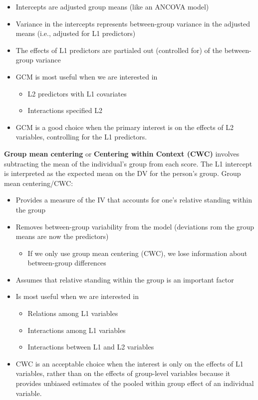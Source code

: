 \documentclass[
  english,
]{book}
\providecommand{\tightlist}{%
  \setlength{\itemsep}{0pt}\setlength{\parskip}{0pt}}
\begin{document}
\begin{itemize}
\tightlist
\item
  Intercepts are adjusted group means (like an ANCOVA model)
\item
  Variance in the intercepts represents between-group variance in the adjusted means (i.e., adjusted for L1 predictors)
\item
  The effects of L1 predictors are partialed out (controlled for) of the between-group variance
\item
  GCM is most useful when we are interested in

  \begin{itemize}
  \tightlist
  \item
    L2 predictors with L1 covariates
  \item
    Interactions specified L2
  \end{itemize}
\item
  GCM is a good choice when the primary interest is on the effects of L2 variables, controlling for the L1 predictors.
\end{itemize}

\textbf{Group mean centering} or \textbf{Centering within Context (CWC)} involves subtracting the mean of the individual's group from each score. The L1 intercept is interpreted as the expected mean on the DV for the person's group. Group mean centering/CWC:

\begin{itemize}
\tightlist
\item
  Provides a measure of the IV that accounts for one's relative standing within the group
\item
  Removes between-group variability from the model (deviations rom the group means are now the predictors)

  \begin{itemize}
  \tightlist
  \item
    If we only use group mean centering (CWC), we lose information about between-group differences
  \end{itemize}
\item
  Assumes that relative standing within the group is an important factor
\item
  Is most useful when we are interested in

  \begin{itemize}
  \tightlist
  \item
    Relations among L1 variables
  \item
    Interactions among L1 variables
  \item
    Interactions between L1 and L2 variables
  \end{itemize}
\item
  CWC is an acceptable choice when the interest is only on the effects of L1 variables, rather than on the effects of group-level variables because it provides unbiased estimates of the pooled within group effect of an individual variable.
\end{itemize}
\end{document}
